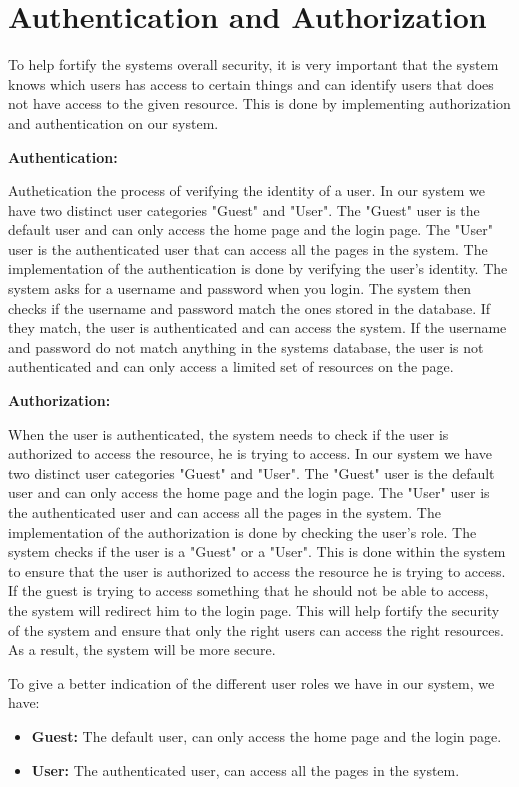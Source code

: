 \section{Authentication and Authorization}

To help fortify the systems overall security, it is very
important that the system knows which users has
access to certain things and can identify users that does not have
access to the given resource. This is done by implementing authorization
and authentication on our system.

\textbf{Authentication:} 

Authetication the process of verifying the
identity of a user. In our system we have two distinct
user categories "Guest" and "User". The "Guest" user
is the default user and can only access the home
page and the login page. The "User" user is the
authenticated user that can access all the pages in
the system.
The implementation of the authentication is done by
verifying the user's identity. The system asks for a
username and password when you login. The system
then checks if the username and password match the
ones stored in the database. If they match, the user
is authenticated and can access the system. If the
username and password do not match anything in
the systems database, the user is not authenticated
and can only access a limited set of resources on the
page. \newline

\textbf{Authorization:} 

When the user is authenticated,
the system needs to check if the user is authorized
to access the resource, he is trying to access. In
our system we have two distinct user categories
"Guest" and "User". The "Guest" user is the default
user and can only access the home page and the
login page. The "User" user is the authenticated
user and can access all the pages in the system.
The implementation of the authorization is done by
checking the user's role. The system checks if the
user is a "Guest" or a "User". This is done within
the system to ensure that the user is authorized to
access the resource he is trying to access. If the
guest is trying to access something that he should
not be able to access, the system will redirect him to
the login page. This will help fortify the security of
the system and ensure that only the right users can
access the right resources. As a result, the system
will be more secure.

To give a better indication of the different user roles we have in our system, we have:
\begin{itemize}
    \item \textbf{Guest:} The default user, can only access the home page and the login page.
    \item \textbf{User:} The authenticated user, can access all the pages in the system.
\end{itemize}

